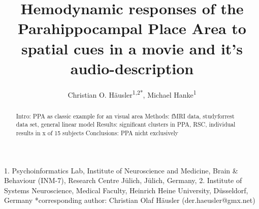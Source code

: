 \documentclass[english]{article}
\begin{document}
\title{Hemodynamic responses of the Parahippocampal Place Area to spatial cues in a movie and it's audio-description}

\author{Christian O. Häusler\textsuperscript{1,2{*}}, Michael Hanke\textsuperscript{1}}

\maketitle
\thispagestyle{fancy}
1. Psychoinformatics Lab, Institute of Neuroscience and Medicine, Brain \& Behaviour (INM-7), Research Centre Jülich, Jülich, Germany,
2. Institute of Systems Neuroscience, Medical Faculty, Heinrich Heine University, Düsseldorf, Germany
{*}corresponding author: Christian Olaf Häusler (der.haeusler@gmx.net)

\begin{abstract}
Intro: PPA as classic example for an visual area
Methods: fMRI data, studyforrest data set, general linear model
Results: significant clusters in PPA, RSC, individual results in x of 15 subjects
Conclusions: PPA nicht exclusively
\end{abstract}
\end{document}
